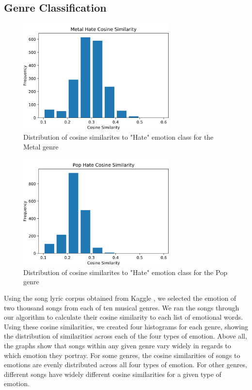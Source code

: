 \documentclass[10pt,twocolumn]{article}
\begin{document}
\subsection{Genre Classification}
\begin{figure}[!hb]
\centering
\includegraphics[width=3.125in]{metal_hate.png}
\caption{Distribution of cosine similarites to "Hate" emotion class for the Metal genre}
\label{fig:digraph}
\end{figure}
\begin{figure}[!hb]
\centering
\includegraphics[width=3.125in]{pop_hate.png}
\caption{Distribution of cosine similarites to "Hate" emotion class for the Pop genre}
\label{fig:digraph}
\end{figure}
Using the song lyric corpus obtained from Kaggle \cite{a14}, we selected the emotion of two thousand songs from each of ten musical genres. We ran the songs through our algorithm to calculate their cosine similarity to each list of emotional words. Using these cosine similarities, we created four histograms for each genre, showing the distribution of similarities across each of the four types of emotion. Above all, the graphs show that songs within any given genre vary widely in regards to which emotion they portray. For some genres, the cosine similarities of songs to emotions are evenly distributed across all four types of emotion.  For other genres, different songs have widely different cosine similarities for a given type of emotion.
\end{document}
